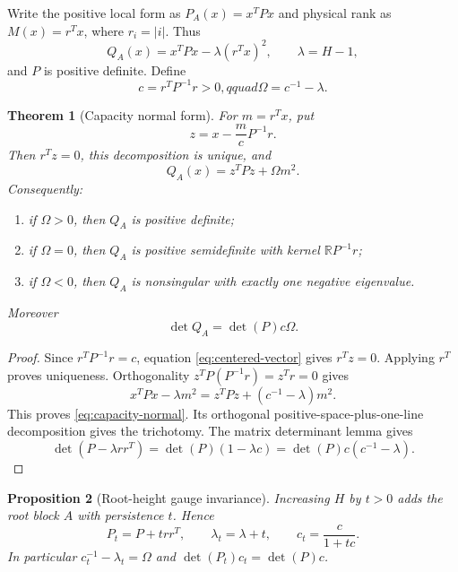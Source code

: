 \documentclass[11pt,a4paper]{amsart}
\theoremstyle{plain}
\newtheorem{theorem}{Theorem}[section]
\newtheorem{proposition}[theorem]{Proposition}
\theoremstyle{definition}
\newcommand{\RR}{\mathbb R}
\begin{document}
Write the positive local form as $P_A(x)=x^TPx$ and physical rank as $M(x)=r^Tx$, where
$r_i=|i|$.  Thus
\[
                         Q_A(x)=x^TPx-\lambda(r^Tx)^2,
                         \qquad\lambda=H-1,
\]
and $P$ is positive definite.  Define
\begin{equation}\label{eq:capacity-definitions}
                  c=r^TP^{-1}r>0,qquad \Omega=c^{-1}-\lambda.
\end{equation}

\begin{theorem}[Capacity normal form]\label{thm:capacity-normal}
For $m=r^Tx$, put
\begin{equation}\label{eq:centered-vector}
                       z=x-\frac{m}{c}P^{-1}r.
\end{equation}
Then $r^Tz=0$, this decomposition is unique, and
\begin{equation}\label{eq:capacity-normal}
                       \boxed{Q_A(x)=z^TPz+\Omega m^2.}       \tag{K}
\end{equation}
Consequently:
\begin{enumerate}[label=(\roman*),leftmargin=2.2em]
\item if $\Omega>0$, then $Q_A$ is positive definite;
\item if $\Omega=0$, then $Q_A$ is positive semidefinite with kernel
$\RR P^{-1}r$;
\item if $\Omega<0$, then $Q_A$ is nonsingular with exactly one negative eigenvalue.
\end{enumerate}
Moreover
\begin{equation}\label{eq:determinant-wall}
                         \det Q_A=\det(P)c\Omega.
\end{equation}
\end{theorem}

\begin{proof}
Since $r^TP^{-1}r=c$, equation \eqref{eq:centered-vector} gives $r^Tz=0$.  Applying $r^T$ proves
uniqueness.  Orthogonality $z^TP(P^{-1}r)=z^Tr=0$ gives
\[
 x^TPx-\lambda m^2=z^TPz+(c^{-1}-\lambda)m^2.
\]
This proves \eqref{eq:capacity-normal}.  Its orthogonal positive-space-plus-one-line decomposition
gives the trichotomy.  The matrix determinant lemma gives
\[
 \det(P-\lambda rr^T)=\det(P)(1-\lambda c)=\det(P)c(c^{-1}-\lambda).
\]
\end{proof}

\begin{proposition}[Root-height gauge invariance]\label{prop:root-gauge}
Increasing $H$ by $t>0$ adds the root block $A$ with persistence $t$.  Hence
\[
 P_t=P+trr^T,\qquad \lambda_t=\lambda+t,\qquad
 c_t=\frac{c}{1+tc}.
\]
In particular $c_t^{-1}-\lambda_t=\Omega$ and
$\det(P_t)c_t=\det(P)c$.
\end{proposition}
\end{document}
